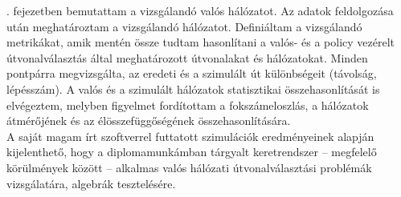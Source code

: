 . fejezetben bemutattam a vizsgálandó valós hálózatot. Az adatok feldolgozása után meghatároztam a vizsgálandó hálózatot. Definiáltam a vizsgálandó metrikákat, amik mentén össze tudtam hasonlítani a valós- és a policy vezérelt útvonalválasztás által meghatározott útvonalakat és hálózatokat. Minden pontpárra megvizsgálta, az eredeti és a szimulált út különbségeit (távolság, lépésszám). A valós és a szimulált hálózatok statisztikai összehasonlítását is elvégeztem, melyben figyelmet fordítottam a fokszámeloszlás, a hálózatok átmérőjének és az élösszefüggőségének összehasonlítására.\\

A saját magam írt szoftverrel futtatott szimulációk eredményeinek alapján kijelenthető, hogy a diplomamunkámban tárgyalt keretrendszer -- megfelelő körülmények között -- alkalmas valós hálózati útvonalválasztási problémák vizsgálatára, algebrák tesztelésére.
